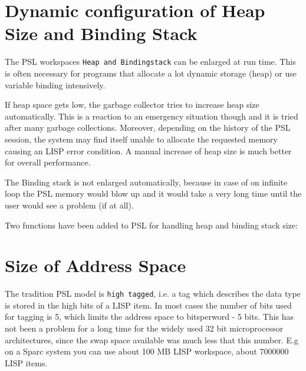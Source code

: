 \section{Dynamic configuration of Heap Size and Binding Stack}           

The PSL workspaces {\tt Heap and Bindingstack}
can be enlarged at run time. This is often necessary for
programs that allocate a lot dynamic storage (heap)
or use variable
binding intensively. 

If heap space gets low, the garbage collector tries to
increase heap size automatically. This is a reaction to an
emergency situation though and it is tried after many garbage
collections.  Moreover, depending on the history of the PSL session,
the system may find itself unable to allocate the requested memory causing
an LISP error condition. A manual increase of heap size 
is much better for overall performance.

The Binding stack is not enlarged automatically, because
in case of on infinite loop the PSL memory would blow up
and it would take a very long time until the user would
see a problem (if at all).

Two functions have been added to PSL
for handling heap and binding stack size:



\section{Size of Address Space}

The tradition PSL model is {\tt high tagged}, i.e. a tag which describes
the data type is stored in the high bits of a LISP item. In most cases
the number of bits used for tagging is 5, which limits the address space
to bitsperword - 5 bits. This has not been a problem for a long time
for the widely used 32 bit microprocessor architectures, 
since the swap space available was much less that this number. E.g
on a Sparc system you can use about 100 MB LISP workspace, about 7000000 
LISP items.

